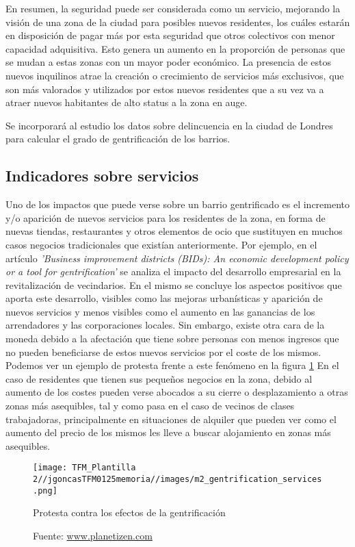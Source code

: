 \documentclass[12pt,a4paper,twoside]{book}
\begin{document}
En resumen, la seguridad puede ser considerada como un servicio, mejorando la visión de una zona de la ciudad para posibles nuevos residentes, los cuáles estarán en disposición de pagar más por esta seguridad que otros colectivos con menor capacidad adquisitiva. Esto genera un aumento en la proporción de personas que se mudan a estas zonas con un mayor poder económico. La presencia de estos nuevos inquilinos atrae la creación o crecimiento de servicios más exclusivos, que son más valorados y utilizados por estos nuevos residentes que a su vez va a atraer nuevos habitantes de alto status a la zona en auge.

Se incorporará al estudio los datos sobre delincuencia en la ciudad de Londres para calcular el grado de gentrificación de los barrios.

\subsection{Indicadores sobre servicios}

Uno de los impactos que puede verse sobre un barrio gentrificado es el incremento y/o aparición de nuevos servicios para los residentes de la zona, en forma de nuevas tiendas, restaurantes y otros elementos de ocio que sustituyen en muchos casos negocios tradicionales que existían anteriormente. Por ejemplo, en el artículo \textit{'Business improvement districts (BIDs): An economic development policy or a tool for gentrification'} \cite{elmedni_business_2018} se analiza el impacto del desarrollo empresarial en la revitalización de vecindarios. En el mismo se concluye los aspectos positivos que aporta este desarrollo, visibles como las mejoras urbanísticas y aparición de nuevos servicios y menos visibles como el aumento en las ganancias de los arrendadores y las corporaciones locales. 
Sin embargo, existe otra cara de la moneda debido a la afectación que tiene sobre personas con menos ingresos que no pueden beneficiarse de estos nuevos servicios por el coste de los mismos. Podemos ver un ejemplo de protesta frente a este fenómeno en la figura \ref{fig:fig_servicios} En el caso de residentes que tienen sus pequeños negocios en la zona, debido al aumento de los costes pueden verse abocados a su cierre o desplazamiento a otras zonas más asequibles, tal y como pasa en el caso de vecinos de clases trabajadoras, principalmente en situaciones de alquiler que pueden ver como el aumento del precio de los mismos les lleve a buscar alojamiento en zonas más asequibles. 

\begin{figure}
    \centering
    \texttt{[image: TFM\_Plantilla 2//jgoncasTFM0125memoria//images/m2\_gentrification\_services.png]}
    \caption{Protesta contra los efectos de la gentrificación}
    \caption*{Fuente: \href{https://www.planetizen.com/definition/gentrification}{www.planetizen.com}}
    \label{fig:fig_servicios}
\end{figure}
\end{document}
